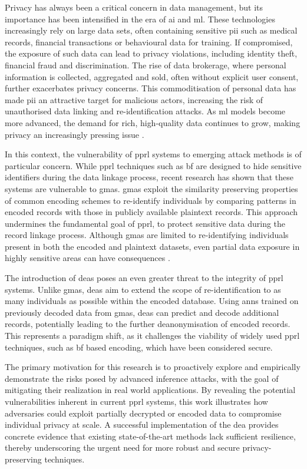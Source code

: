 Privacy has always been a critical concern in data management, but its importance has been intensified in the era of \ac{ai} and \ac{ml}.
These technologies increasingly rely on large data sets, often containing sensitive \ac{pii} such as medical records, financial transactions or behavioural data for training. If compromised, the exposure of such data can lead to privacy violations, including identity theft, financial fraud and discrimination.
The rise of data brokerage, where personal information is collected, aggregated and sold, often without explicit user consent, further exacerbates privacy concerns.
This commoditisation of personal data has made \ac{pii} an attractive target for malicious actors, increasing the risk of unauthorised data linking and re-identification attacks.
As \ac{ml} models become more advanced, the demand for rich, high-quality data continues to grow, making privacy an increasingly pressing issue \cite{king2024rethinking, manheim2019artificial}.

In this context, the vulnerability of \ac{pprl} systems to emerging attack methods is of particular concern.
While \ac{pprl} techniques such as \ac{bf} are designed to hide sensitive identifiers during the data linkage process, recent research has shown that these systems are vulnerable to \ac{gma}s.
\ac{gma}s exploit the similarity preserving properties of common encoding schemes to re-identify individuals by comparing patterns in encoded records with those in publicly available plaintext records.
This approach undermines the fundamental goal of \ac{pprl}, to protect sensitive data during the record linkage process.
Although \ac{gma}s are limited to re-identifying individuals present in both the encoded and plaintext datasets, even partial data exposure in highly sensitive areas can have consequences \cite{schaefer2024,vidanage2020graph}.

The introduction of \ac{dea}s poses an even greater threat to the integrity of \ac{pprl} systems.
Unlike \ac{gma}s, \ac{dea}s aim to extend the scope of re-identification to as many individuals as possible within the encoded database.
Using \ac{ann}s trained on previously decoded data from \ac{gma}s, \ac{dea}s can predict and decode additional records, potentially leading to the further deanonymisation of encoded records.
This represents a paradigm shift, as it challenges the viability of widely used \ac{pprl} techniques, such as \ac{bf} based encoding, which have been considered secure.

The primary motivation for this research is to proactively explore and empirically demonstrate the risks posed by advanced inference attacks, with the goal of mitigating their realization in real world applications.
By revealing the potential vulnerabilities inherent in current \ac{pprl} systems, this work illustrates how adversaries could exploit partially decrypted or encoded data to compromise individual privacy at scale.
A successful implementation of the \ac{dea} provides concrete evidence that existing state-of-the-art methods lack sufficient resilience, thereby underscoring the urgent need for more robust and secure privacy-preserving techniques.



